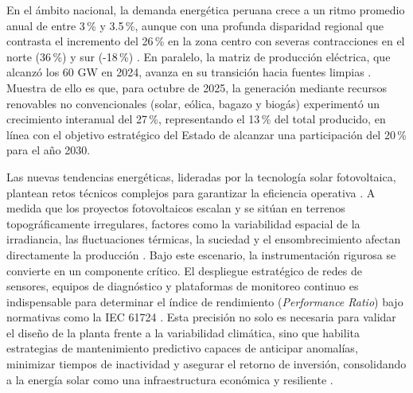 \documentclass[../../General.tex]{subfiles}
\begin{document}
En el ámbito nacional, la demanda energética peruana crece a un ritmo promedio anual de entre 3\,\% y 3.5\,\%, aunque con una profunda disparidad regional que contrasta el incremento del 26\,\% en la zona centro con severas contracciones en el norte (36\,\%) y sur (-18\,\%) \citep{ICEX2025}. En paralelo, la matriz de producción eléctrica, que alcanzó los 60 GW en 2024, avanza en su transición hacia fuentes limpias \citep{ProActivo2025}. Muestra de ello es que, para octubre de 2025, la generación mediante recursos renovables no convencionales (solar, eólica, bagazo y biogás) experimentó un crecimiento interanual del 27\,\%, representando el 13\,\% del total producido, en línea con el objetivo estratégico del Estado de alcanzar una participación del 20\,\% para el año 2030.

Las nuevas tendencias energéticas, lideradas por la tecnología solar fotovoltaica, plantean retos técnicos complejos para garantizar la eficiencia operativa \citep{XPower2024}. A medida que los proyectos fotovoltaicos escalan y se sitúan en terrenos topográficamente irregulares, factores como la variabilidad espacial de la irradiancia, las fluctuaciones térmicas, la suciedad y el ensombrecimiento afectan directamente la producción \citep{Salinas2025}. Bajo este escenario, la instrumentación rigurosa se convierte en un componente crítico. El despliegue estratégico de redes de sensores, equipos de diagnóstico y plataformas de monitoreo continuo es indispensable para determinar el índice de rendimiento (\textit{Performance Ratio}) bajo normativas como la IEC 61724 \citep{IEC61724-1_2021}. Esta precisión no solo es necesaria para validar el diseño de la planta frente a la variabilidad climática, sino que habilita estrategias de mantenimiento predictivo capaces de anticipar anomalías, minimizar tiempos de inactividad y asegurar el retorno de inversión, consolidando a la energía solar como una infraestructura económica y resiliente \citep{Anatrac}.
\end{document}
